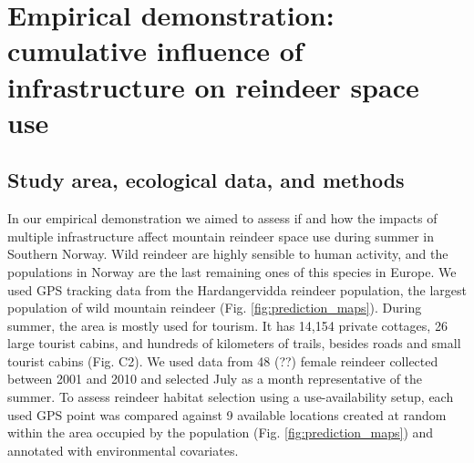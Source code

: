 \documentclass[titlepage]{article}
\begin{document}

\section{Empirical demonstration: cumulative influence of infrastructure on reindeer space use}

\subsection{Study area, ecological data, and methods}

In our empirical demonstration we aimed to assess if and how the impacts of multiple infrastructure affect mountain reindeer space use during summer in Southern Norway. Wild reindeer are highly sensible to human activity, and the populations in Norway are the last remaining ones of this species in Europe. We used GPS tracking data from the Hardangervidda reindeer population, the largest population of wild mountain reindeer (Fig. \ref{fig:prediction_maps}). During summer, the area is mostly used for tourism. It has 14,154 private cottages, 26 large tourist cabins, and hundreds of kilometers of trails, besides roads and small tourist cabins (Fig. C2). We used data from 48 (??) female reindeer collected between 2001 and 2010 \citep[see][for further details]{panzacchi_searching_2015} and selected July as a month representative of the summer. To assess reindeer habitat selection using a use-availability setup, each used GPS point was compared against 9 available locations created at random within the area occupied by the population (Fig. \ref{fig:prediction_maps}) and annotated with environmental covariates.
\end{document}
